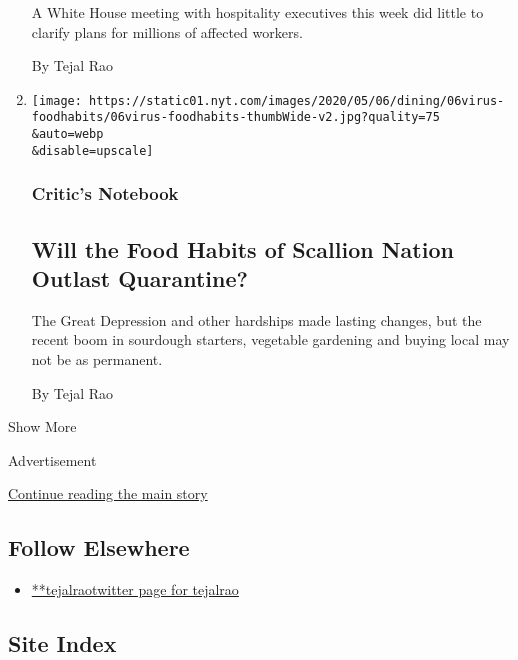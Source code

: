 \begin{enumerate}
  A White House meeting with hospitality executives this week did little
  to clarify plans for millions of affected workers.

  By Tejal Rao
\item
  \href{/2020/04/30/dining/fresh-greens-quarantine-coronavirus.html}{}

  \texttt{[image: https://static01.nyt.com/images/2020/05/06/dining/06virus-foodhabits/06virus-foodhabits-thumbWide-v2.jpg?quality=75\\\&auto=webp\\\&disable=upscale]}

  \hypertarget{critics-notebook-5}{%
  \subsubsection{Critic's Notebook}\label{critics-notebook-5}}

  \hypertarget{will-the-food-habits-of-scallion-nation-outlast-quarantine}{%
  \subsection{Will the Food Habits of Scallion Nation Outlast
  Quarantine?}\label{will-the-food-habits-of-scallion-nation-outlast-quarantine}}

  The Great Depression and other hardships made lasting changes, but the
  recent boom in sourdough starters, vegetable gardening and buying
  local may not be as permanent.

  By Tejal Rao
\end{enumerate}

Show More

Advertisement

\protect\hyperlink{after-mid2}{Continue reading the main story}

\hypertarget{follow-elsewhere}{%
\subsection{Follow Elsewhere}\label{follow-elsewhere}}

\begin{itemize}
\tightlist
\item
  \href{https://twitter.com/tejalrao}{**tejalraotwitter page for
  tejalrao}
\end{itemize}

\hypertarget{site-index}{%
\subsection{Site Index}\label{site-index}}

